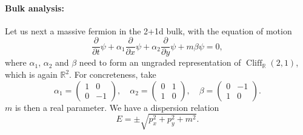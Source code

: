 \documentclass[12pt]{article}
\numberwithin{equation}{section}
\numberwithin{figure}{section}
\theoremstyle{remark}
\def\bR{\mathbb{R}}
\def\Cliff{\mathop{\mathrm{Cliff}}\nolimits}
\begin{document}
\paragraph{Bulk analysis:}
Let us next a massive fermion in the 2+1d bulk, with the equation of motion \begin{equation}
\frac{\partial}{\partial t} \psi +\alpha_1 \frac{\partial} {\partial x}\psi   
+\alpha_2\frac{\partial}{\partial y}\psi + m\beta\psi=0,
\end{equation} where $\alpha_1$, $\alpha_2$ and $\beta$ need to form 
an ungraded representation of $\Cliff_\bR(2,1)$, which is again $\bR^2$.
For concreteness, take \begin{equation}
\alpha_1=\begin{pmatrix}
1 & 0\\
0 & -1
\end{pmatrix},\quad
\alpha_2 = \begin{pmatrix}
0 & 1\\
1 & 0
\end{pmatrix},\quad
\beta = \begin{pmatrix}
0 & -1 \\
1 &  0
\end{pmatrix}.
\end{equation}
$m$ is then a real parameter. We have a dispersion relation \begin{equation}
E=\pm \sqrt{p_x^2 + p_y^2 + m^2}.
\end{equation}
\end{document}
